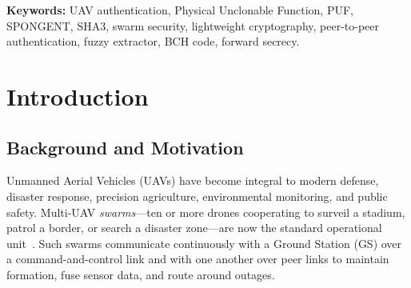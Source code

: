 \documentclass[11pt,a4paper]{article}
\begin{document}
\begin{abstract}
result is falsifiable. A second track runs the same handshake over a real
IEEE~802.11 stack with genuine CSMA/CA contention, where measured end-to-end
latency rises to $11.9$~ms while the protocol's own compute stays at $0.42$~ms:
the difference is the channel, not the protocol. Measured on the same host as
RSA-2048 and elliptic-curve baselines, the ephemeral key exchange this protocol
mandates for forward secrecy costs about as much as a bare ECDH/ECDSA exchange,
not an order of magnitude less. A full same-platform
handshake-to-handshake comparison against real RSA-authenticated and
ECDSA-authenticated ephemeral-DH protocols places this work at $1.66$~ms against
$1.77$~ms (RSA) and $0.79$~ms (ECDSA): comparable to a fully-costed RSA
handshake, and genuinely slower than ECDSA, the disclosed cost of storing no
long-term secret on the device. This protocol's advantages are properties rather
than raw speed: no stored long-term secret, no certificate infrastructure,
GS-free peer authentication, and capture damage bounded to a node's own links.
\end{abstract}

\textbf{Keywords:} UAV authentication, Physical Unclonable Function, PUF,
SPONGENT, SHA3, swarm security, lightweight cryptography, peer-to-peer
authentication, fuzzy extractor, BCH code, forward secrecy.

\newpage
\tableofcontents
\newpage

\section{Introduction}
\label{sec:introduction}

\subsection{Background and Motivation}

Unmanned Aerial Vehicles (UAVs) have become integral to modern defense,
disaster response, precision agriculture, environmental monitoring, and public
safety. Multi-UAV \emph{swarms}---ten or more drones cooperating to surveil a
stadium, patrol a border, or search a disaster zone---are now the standard
operational unit~\cite{securing_uav_fanet}. Such swarms communicate
continuously with a Ground Station (GS) over a command-and-control link and
with one another over peer links to maintain formation, fuse sensor data, and
route around outages.
\end{document}
